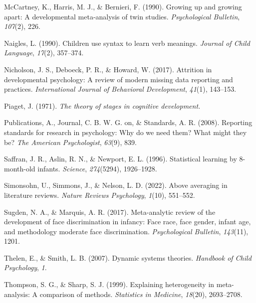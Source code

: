 \documentclass[
  man]{apa6}
\newlength{\cslhangindent}
\newlength{\cslentryspacingunit} %
\newenvironment{CSLReferences}[2] %
 {%
  \setlength{\parindent}{0pt}
  \ifodd #1
  \let\oldpar\par
  \def\par{\hangindent=\cslhangindent\oldpar}
  \fi
  \setlength{\parskip}{#2\cslentryspacingunit}
 }%
 {}
\begin{document}
\begin{CSLReferences}{1}{0}
\leavevmode{}%
McCartney, K., Harris, M. J., \& Bernieri, F. (1990). Growing up and growing apart: A developmental meta-analysis of twin studies. \emph{Psychological Bulletin}, \emph{107}(2), 226.

\leavevmode{}%
Naigles, L. (1990). Children use syntax to learn verb meanings. \emph{Journal of Child Language}, \emph{17}(2), 357--374.

\leavevmode{}%
Nicholson, J. S., Deboeck, P. R., \& Howard, W. (2017). Attrition in developmental psychology: A review of modern missing data reporting and practices. \emph{International Journal of Behavioral Development}, \emph{41}(1), 143--153.

\leavevmode{}%
Piaget, J. (1971). \emph{The theory of stages in cognitive development.}

\leavevmode{}%
Publications, A., Journal, C. B. W. G. on, \& Standards, A. R. (2008). Reporting standards for research in psychology: Why do we need them? What might they be? \emph{The American Psychologist}, \emph{63}(9), 839.

\leavevmode{}%
Saffran, J. R., Aslin, R. N., \& Newport, E. L. (1996). Statistical learning by 8-month-old infants. \emph{Science}, \emph{274}(5294), 1926--1928.

\leavevmode{}%
Simonsohn, U., Simmons, J., \& Nelson, L. D. (2022). Above averaging in literature reviews. \emph{Nature Reviews Psychology}, \emph{1}(10), 551--552.

\leavevmode{}%
Sugden, N. A., \& Marquis, A. R. (2017). Meta-analytic review of the development of face discrimination in infancy: Face race, face gender, infant age, and methodology moderate face discrimination. \emph{Psychological Bulletin}, \emph{143}(11), 1201.

\leavevmode{}%
Thelen, E., \& Smith, L. B. (2007). Dynamic systems theories. \emph{Handbook of Child Psychology}, \emph{1}.

\leavevmode{}%
Thompson, S. G., \& Sharp, S. J. (1999). Explaining heterogeneity in meta-analysis: A comparison of methods. \emph{Statistics in Medicine}, \emph{18}(20), 2693--2708.


\end{CSLReferences}
\end{document}
